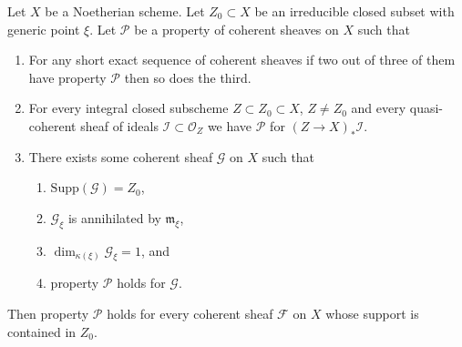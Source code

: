 \begin{lemma}
\label{lemma-property-irreducible}
Let $X$ be a Noetherian scheme.
Let $Z_0 \subset X$ be an irreducible closed subset with generic point $\xi$.
Let $\mathcal{P}$ be a property of coherent sheaves on $X$ such that
\begin{enumerate}
\item For any short exact sequence of coherent sheaves if two
out of three of them have property $\mathcal{P}$ then so does the
third.
\item For every integral closed subscheme $Z \subset Z_0 \subset X$,
$Z \not = Z_0$ and every quasi-coherent sheaf of ideals
$\mathcal{I} \subset \mathcal{O}_Z$ we have
$\mathcal{P}$ for $(Z \to X)_*\mathcal{I}$.
\item There exists some coherent sheaf $\mathcal{G}$ on $X$ such that
\begin{enumerate}
\item $\text{Supp}(\mathcal{G}) = Z_0$,
\item $\mathcal{G}_\xi$ is annihilated by $\mathfrak m_\xi$,
\item $\dim_{\kappa(\xi)} \mathcal{G}_\xi = 1$, and
\item property $\mathcal{P}$ holds for $\mathcal{G}$.
\end{enumerate}
\end{enumerate}
Then property $\mathcal{P}$ holds for every coherent sheaf
$\mathcal{F}$ on $X$ whose support is contained in $Z_0$.
\end{lemma}


